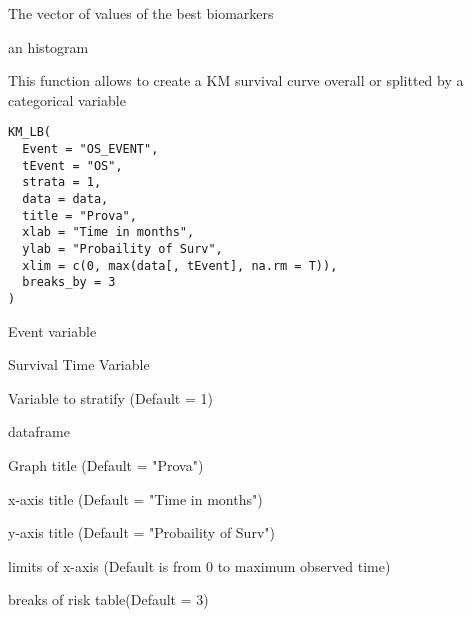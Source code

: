 \documentclass[a4paper]{book}
\begin{document}
%
\begin{Arguments}
\begin{ldescription}
\item[\code{kmax.cycle}] The vector of values of the best biomarkers
\end{ldescription}
\end{Arguments}
%
\begin{Value}
an histogram
\end{Value}
%
\begin{Description}
This function allows to create a KM survival curve overall or splitted by a categorical variable
\end{Description}
%
\begin{Usage}
\begin{verbatim}
KM_LB(
  Event = "OS_EVENT",
  tEvent = "OS",
  strata = 1,
  data = data,
  title = "Prova",
  xlab = "Time in months",
  ylab = "Probaility of Surv",
  xlim = c(0, max(data[, tEvent], na.rm = T)),
  breaks_by = 3
)
\end{verbatim}
\end{Usage}
%
\begin{Arguments}
\begin{ldescription}
\item[\code{Event}] Event variable

\item[\code{tEvent}] Survival Time Variable

\item[\code{strata}] Variable to stratify (Default = 1)

\item[\code{data}] dataframe

\item[\code{title}] Graph title (Default = "Prova")

\item[\code{xlab}] x-axis title (Default = "Time in months")

\item[\code{ylab}] y-axis title (Default = "Probaility of Surv")

\item[\code{xlim}] limits of x-axis (Default is from 0 to maximum observed time)

\item[\code{breaks\_by}] breaks of risk table(Default = 3)
\end{ldescription}
\end{Arguments}
\end{document}
